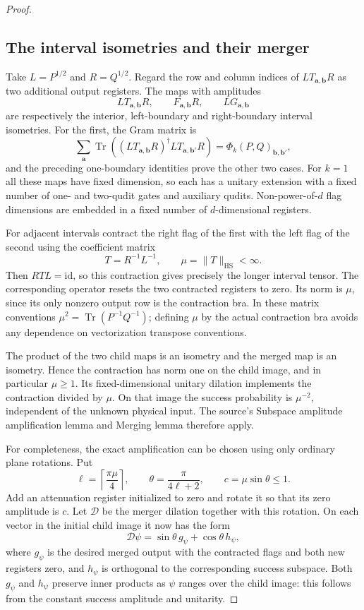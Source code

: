 \documentclass[11pt]{article}
\newcommand{\HS}{\mathrm{HS}}
\newcommand{\id}{\mathrm{id}}
\begin{document}
\begin{proof}
\subsection*{The interval isometries and their merger}

Take $L=P^{1/2}$ and $R=Q^{1/2}$. Regard the row and column indices
of $LT_{\mathbf a,\mathbf b}R$ as two additional output registers.
The maps with amplitudes
\[
 LT_{\mathbf a,\mathbf b}R,\qquad
 F_{\mathbf a,\mathbf b}R,\qquad
 LG_{\mathbf a,\mathbf b}
\]
are respectively the interior, left-boundary and right-boundary
interval isometries. For the first, the Gram matrix is
\[
 \sum_{\mathbf a}\operatorname{Tr}\!\left(
 (LT_{\mathbf a,\mathbf b}R)^\dagger
  LT_{\mathbf a,\mathbf b'}R\right)
 =\Phi_k(P,Q)_{\mathbf b,\mathbf b'},
\]
and the preceding one-boundary identities prove the other two cases.
For $k=1$ all these maps have fixed dimension, so each has a unitary
extension with a fixed number of one- and two-qudit gates and
auxiliary qudits. Non-power-of-$d$ flag dimensions are embedded in
a fixed number of $d$-dimensional registers.

For adjacent intervals contract the right flag of the first with
the left flag of the second using the coefficient matrix
\[
 T=R^{-1}L^{-1},\qquad
 \mu=\|T\|_{\HS}<\infty.
\]
Then $RTL=\id$, so this contraction gives precisely the longer
interval tensor. The corresponding operator resets the two
contracted registers to zero. Its norm is $\mu$, since its only
nonzero output row is the contraction bra. In these matrix
conventions $\mu^2=\operatorname{Tr}(P^{-1}Q^{-1})$;
defining $\mu$ by the actual contraction bra avoids any dependence
on vectorization transpose conventions.

The product of the two child maps is an isometry and the merged
map is an isometry. Hence the contraction has norm one on the
child image, and in particular $\mu\geq1$. Its fixed-dimensional
unitary dilation implements the contraction divided by $\mu$.
On that image the success probability is $\mu^{-2}$, independent
of the unknown physical input. The source's Subspace amplitude
amplification lemma and Merging lemma therefore apply.

For completeness, the exact amplification can be chosen using
only ordinary plane rotations. Put
\[
 \ell=\left\lceil\frac{\pi\mu}{4}\right\rceil,
 \qquad \theta=\frac{\pi}{4\ell+2},
 \qquad c=\mu\sin\theta\leq1.
\]
Add an attenuation register initialized to zero and rotate it so
that its zero amplitude is $c$. Let $\mathcal D$ be the merger
dilation together with this rotation. On each vector in the
initial child image it now has the form
\[
 \mathcal D\psi
   =\sin\theta\,g_\psi+\cos\theta\,h_\psi,
\]
where $g_\psi$ is the desired merged output with the contracted
flags and both new registers zero, and $h_\psi$ is orthogonal to
the corresponding success subspace. Both $g_\psi$ and $h_\psi$
preserve inner products as $\psi$ ranges over the child image:
this follows from the constant success amplitude and unitarity.


\end{proof}
\end{document}
